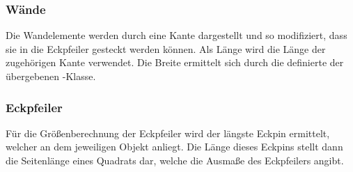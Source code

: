 \subsubsection{Wände}
Die Wandelemente werden durch eine Kante dargestellt und so modifiziert, dass sie in die Eckpfeiler gesteckt werden können.
Als Länge wird die Länge der zugehörigen Kante verwendet.
Die Breite ermittelt sich durch die definierte  der übergebenen -Klasse.

\subsubsection{Eckpfeiler}
Für die Größenberechnung der Eckpfeiler wird der längste Eckpin ermittelt, welcher an dem jeweiligen Objekt anliegt.
Die Länge dieses Eckpins stellt dann die Seitenlänge eines Quadrats dar, welche die Ausmaße des Eckpfeilers angibt.

